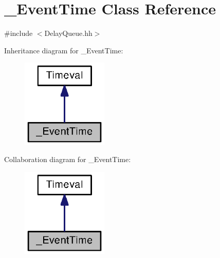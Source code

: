 \section{\+\_\+\+Event\+Time Class Reference}
\label{class__EventTime}


{\ttfamily \#include $<$Delay\+Queue.\+hh$>$}



Inheritance diagram for \+\_\+\+Event\+Time\+:
\nopagebreak
\begin{figure}[H]
\begin{center}
\leavevmode
\includegraphics[width=116pt]{class__EventTime__inherit__graph}
\end{center}
\end{figure}


Collaboration diagram for \+\_\+\+Event\+Time\+:
\nopagebreak
\begin{figure}[H]
\begin{center}
\leavevmode
\includegraphics[width=116pt]{class__EventTime__coll__graph}
\end{center}
\end{figure}
